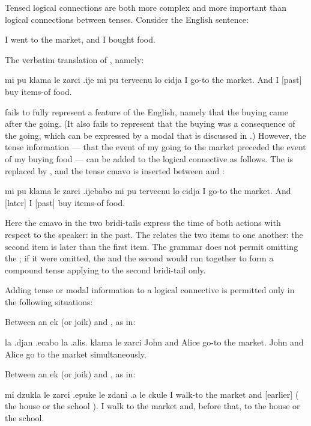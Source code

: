 Tensed logical connections are both more complex and more
    important than logical connections between tenses. Consider the
    English sentence:
\begin{example}
I went to the market, and I bought food.
\end{example}

The verbatim translation of , namely:
\begin{example}
mi pu klama le zarci .ije mi pu tervecnu lo cidja\n
I  go-to the market. And I [past] buy items-of food.
\end{example}

{\noindent}fails to fully represent a feature of the English, namely that
    the buying came after the going. (It also fails to represent
    that the buying was a consequence of the going, which can be
    expressed by a modal that is discussed in .) However, the tense
    information --- that the event of my going to the market
    preceded the event of my buying food --- can be added to the
    logical connective as follows. The  is replaced by
    , and the tense cmavo  is inserted between
     and :
\begin{example}
mi pu klama le zarci\n
\T	.ijebabo mi pu tervecnu lo cidja\n
I  go-to the market.\n
\T	And [later] I [past] buy items-of food.
\end{example}

Here the  cmavo in the two bridi-tails express the
    time of both actions with respect to the speaker: in the past.
    The  relates the two items to one another: the second
    item is later than the first item. The grammar does not permit
    omitting the ; if it were omitted, the  and the
    second  would run together to form a compound tense
     applying to the second bridi-tail only.

Adding tense or modal information to
    a logical connective is permitted only in the following
    situations:

Between an ek (or joik) and , as in:
\begin{example}
la .djan .ecabo la .alis. klama le zarci\n
John and  Alice go-to the market.\n
John and Alice go to the market simultaneously.
\end{example}

Between an ek (or joik) and , as
    in:
\begin{example}
mi dzukla le zarci\n
\T	.epuke le zdani .a le ckule \n
I walk-to the market\n
\T	and [earlier] ( the house or the school ).\n
I walk to the market and,\n
\T	before that, to the house or the school.
\end{example}

